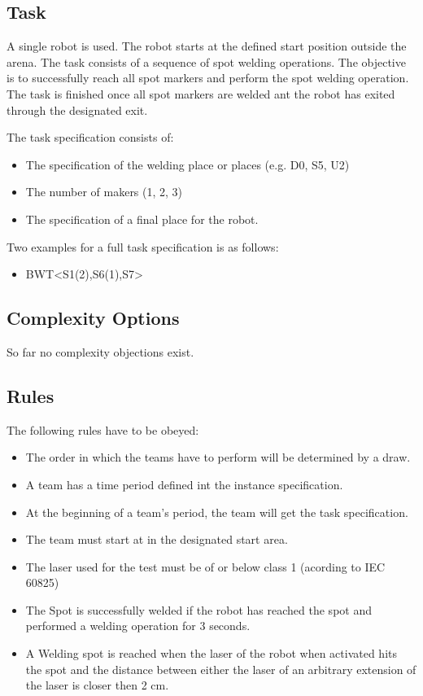 \subsection{Task}
A single robot is used. The robot starts at the defined start position outside the arena. The task consists of a sequence of spot welding operations. The objective is to successfully reach all spot markers and perform the spot welding operation. The task is finished once all spot markers are welded ant the robot has exited through the designated exit.
\par
The task specification consists of: 
\begin{itemize}
	\item The specification of the welding place or places (e.g. D0, S5, U2)
	\item The number of makers (1, 2, 3)
	\item The specification of a final place for the robot.
\end{itemize}

Two examples for a full task specification is as follows:
\begin{itemize}
	\item BWT\textless S1(2),S6(1),S7\textgreater 
\end{itemize}


\subsection{Complexity Options}

So far no complexity objections exist.

\subsection{Rules}
The following rules have to be obeyed:

\begin{itemize}
\item The order in which the teams have to perform will be determined by a draw.
\item A team has a time period defined int the instance specification.
\item At the beginning of a team’s period, the team will get the task specification. 
\item The team must start at in the designated start area.
\item The laser used for the test must be of or below class 1 (acording to IEC 60825)
\item The Spot is successfully welded if the robot has reached the spot and performed a welding operation for 3 seconds.
\item A Welding spot is reached when the laser of the robot when activated hits the spot and the distance between either the laser of an arbitrary extension of the laser is closer then 2 cm.
\end{itemize}


